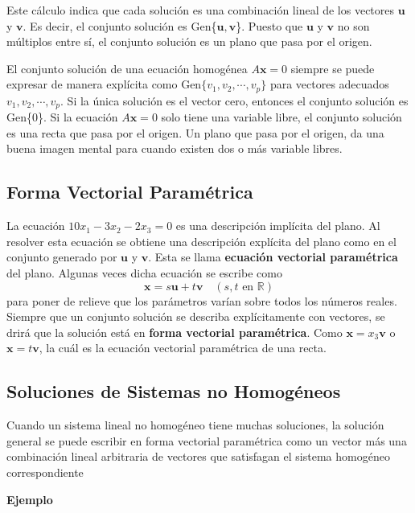 \documentclass{article}
\begin{document}
Este cálculo indica que cada solución es una combinación lineal de los vectores $\mathbf{u}$ y $\mathbf{v}$. Es decir, el conjunto solución es Gen\{$\mathbf{u}, \mathbf{v}$\}. Puesto que $\mathbf{u}$ y $\mathbf{v}$ no son múltiplos entre sí, el conjunto solución es un plano que pasa por el origen.

El conjunto solución de una ecuación homogénea $A\mathbf{x} = 0$ siempre se puede expresar de manera explícita como Gen$\{v_1, v_2,\dotsb, v_p\}$ para vectores adecuados $v_1, v_2, \dotsb, v_p$. Si la única solución es el vector cero, entonces el conjunto solución es Gen\{0\}. Si la ecuación $A\mathbf{x} = 0$ solo tiene una variable libre, el conjunto solución es una recta que pasa por el origen. Un plano que pasa por el origen, da una buena imagen mental para cuando existen dos o más variable libres.

\subsection*{Forma Vectorial Paramétrica}

La ecuación $10x_1 - 3x_2 - 2x_3 = 0$ es una descripción implícita del plano. Al resolver esta ecuación se obtiene una descripción explícita del plano como en el conjunto generado por $\mathbf{u}$ y $\mathbf{v}$. Esta se llama \textbf{ecuación vectorial paramétrica} del plano. Algunas veces dicha ecuación se escribe como $$\mathbf{x} = s\mathbf{u} + t\mathbf{v} \quad (s,t \text{ en } \mathbb{R})$$ para poner de relieve que los parámetros varían sobre todos los números reales. Siempre que un conjunto solución se describa explícitamente con vectores, se drirá que la solución está en \textbf{forma vectorial paramétrica}. Como $\mathbf{x} = x_3\mathbf{v}$ o $\mathbf{x} = t\mathbf{v}$, la cuál es la ecuación vectorial paramétrica de una recta.

\subsection*{Soluciones de Sistemas no Homogéneos}

Cuando un sistema lineal no homogéneo tiene muchas soluciones, la solución general se puede escribir en forma vectorial paramétrica como un vector más una combinación lineal arbitraria de vectores que satisfagan el sistema homogéneo correspondiente

\begin{large}
    \textbf{Ejemplo}
\end{large}
\end{document}
